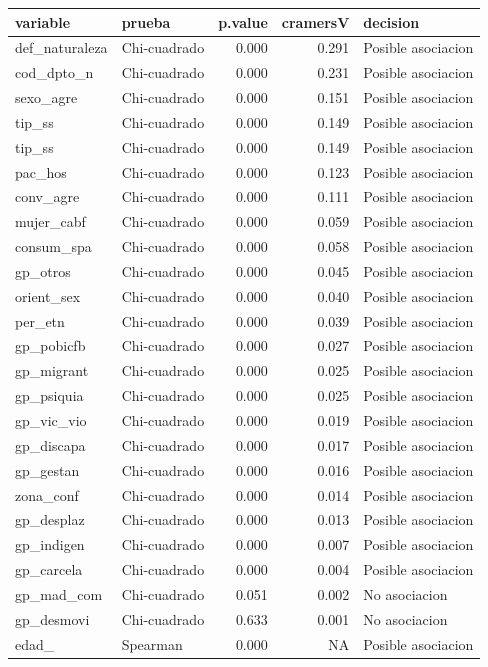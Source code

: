 \documentclass[
]{article}
\begin{document}
\begin{longtable}[]{@{}llrrl@{}}
\toprule\noalign{}
variable & prueba & p.value & cramersV & decision \\
\midrule\noalign{}
\endhead
\bottomrule\noalign{}
\endlastfoot
def\_naturaleza & Chi-cuadrado & 0.000 & 0.291 & Posible asociacion \\
cod\_dpto\_n & Chi-cuadrado & 0.000 & 0.231 & Posible asociacion \\
sexo\_agre & Chi-cuadrado & 0.000 & 0.151 & Posible asociacion \\
tip\_ss & Chi-cuadrado & 0.000 & 0.149 & Posible asociacion \\
tip\_ss & Chi-cuadrado & 0.000 & 0.149 & Posible asociacion \\
pac\_hos & Chi-cuadrado & 0.000 & 0.123 & Posible asociacion \\
conv\_agre & Chi-cuadrado & 0.000 & 0.111 & Posible asociacion \\
mujer\_cabf & Chi-cuadrado & 0.000 & 0.059 & Posible asociacion \\
consum\_spa & Chi-cuadrado & 0.000 & 0.058 & Posible asociacion \\
gp\_otros & Chi-cuadrado & 0.000 & 0.045 & Posible asociacion \\
orient\_sex & Chi-cuadrado & 0.000 & 0.040 & Posible asociacion \\
per\_etn & Chi-cuadrado & 0.000 & 0.039 & Posible asociacion \\
gp\_pobicfb & Chi-cuadrado & 0.000 & 0.027 & Posible asociacion \\
gp\_migrant & Chi-cuadrado & 0.000 & 0.025 & Posible asociacion \\
gp\_psiquia & Chi-cuadrado & 0.000 & 0.025 & Posible asociacion \\
gp\_vic\_vio & Chi-cuadrado & 0.000 & 0.019 & Posible asociacion \\
gp\_discapa & Chi-cuadrado & 0.000 & 0.017 & Posible asociacion \\
gp\_gestan & Chi-cuadrado & 0.000 & 0.016 & Posible asociacion \\
zona\_conf & Chi-cuadrado & 0.000 & 0.014 & Posible asociacion \\
gp\_desplaz & Chi-cuadrado & 0.000 & 0.013 & Posible asociacion \\
gp\_indigen & Chi-cuadrado & 0.000 & 0.007 & Posible asociacion \\
gp\_carcela & Chi-cuadrado & 0.000 & 0.004 & Posible asociacion \\
gp\_mad\_com & Chi-cuadrado & 0.051 & 0.002 & No asociacion \\
gp\_desmovi & Chi-cuadrado & 0.633 & 0.001 & No asociacion \\
edad\_ & Spearman & 0.000 & NA & Posible asociacion \\
\end{longtable}
\end{document}
